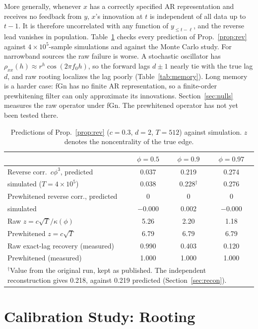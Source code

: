 \documentclass[10pt,twocolumn,letterpaper]{article}
\theoremstyle{definition}
\theoremstyle{remark}
\begin{document}
More generally, whenever $x$ has a correctly specified AR representation and
receives no feedback from $y$, $x$'s innovation at $t$ is independent of all
data up to $t-1$. It is therefore uncorrelated with any function of
$y_{\le t-\ell}$, and the reverse lead vanishes in population.
Table~\ref{tab:prop2} checks every prediction of Prop.~\ref{prop:rev} against
$4\times10^5$-sample simulations and against the Monte Carlo study. For
narrowband sources the raw failure is worse. A stochastic oscillator has
$\rho_{xx}(h)\approx r^h\cos(2\pi f_0h)$, so the forward lags $d\pm1$ nearly tie
with the true lag $d$, and raw rooting localizes the lag poorly
(Table~\ref{tab:memory}). Long memory is a harder case: fGn has no finite AR
representation, so a finite-order prewhitening filter can only approximate its
innovations. Section~\ref{sec:nulls} measures the raw operator under fGn. The
prewhitened operator has not yet been tested there.

\begin{table}[t]
\centering\footnotesize
\caption{Predictions of Prop.~\ref{prop:rev} ($c=0.3$, $d=2$, $T=512$) against
simulation. $z$ denotes the noncentrality of the true edge.}
\label{tab:prop2}
\begin{tabular}{@{}lccc@{}}
\toprule
 & $\phi=0.5$ & $\phi=0.9$ & $\phi=0.97$\\
\midrule
Reverse corr.\ $c\phi^3$, predicted & 0.037 & 0.219 & 0.274\\
\quad simulated ($T=4\times10^5$) & 0.038 & 0.228$^{\dagger}$ & 0.276\\
Prewhitened reverse corr., predicted & 0 & 0 & 0\\
\quad simulated & $-0.000$ & 0.002 & $-0.000$\\
Raw $z=c\sqrt T/\kappa(\phi)$ & 5.26 & 2.20 & 1.18\\
Prewhitened $z=c\sqrt T$ & 6.79 & 6.79 & 6.79\\
Raw exact-lag recovery (measured) & 0.990 & 0.403 & 0.120\\
Prewhitened (measured) & 1.000 & 1.000 & 1.000\\
\bottomrule
\multicolumn{4}{p{0.95\columnwidth}}{\scriptsize $^{\dagger}$Value from the
original run, kept as published. The independent reconstruction gives 0.218,
against 0.219 predicted (Section~\ref{sec:recon}).}
\end{tabular}
\end{table}

\section{Calibration Study: Rooting}\label{sec:calroot}
\end{document}
